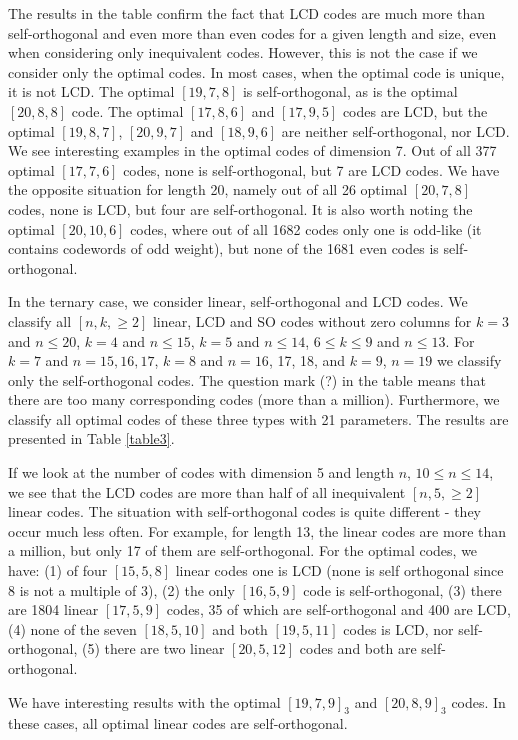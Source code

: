 \documentclass[a4paper,11pt]{article}
\begin{document}
The results in the table confirm the fact that LCD codes are much more than self-orthogonal and even more than even codes for a given length and size, even when considering only inequivalent codes. However, this is not the case if we consider only the optimal codes. In most cases, when the optimal code is unique, it is not LCD. The optimal $[19,7,8]$ is self-orthogonal, as is the optimal $[20,8,8]$ code. The optimal $[17,8,6]$ and $[17,9,5]$ codes are LCD, but the optimal $[19,8,7]$, $[20,9,7]$ and $[18,9,6]$ are neither self-orthogonal, nor LCD. We see interesting examples in the optimal codes of dimension 7. Out of all 377 optimal $[17,7,6]$ codes, none is self-orthogonal, but 7 are LCD codes. We have the opposite situation for length 20, namely out of all 26 optimal $[20,7,8]$ codes, none is LCD, but four are self-orthogonal. It is also worth noting the optimal $[20,10,6]$ codes, where out of all 1682 codes only one is odd-like (it contains codewords of odd weight), but none of the 1681 even codes is self-orthogonal.

In the ternary case, we consider linear, self-orthogonal and LCD codes. We classify all $[n,k,\ge 2]$ linear, LCD and SO codes without zero columns for $k=3$ and $n\le 20$, $k=4$ and $n\le 15$, $k=5$ and $n\le 14$, $6\le k\le 9$ and $n\le 13$. For $k=7$ and $n=15,16,17$, $k=8$ and $n=16$, 17, 18, and $k=9$, $n=19$ we classify only the self-orthogonal codes.  The question mark (?) in the table means that there are too many corresponding codes (more than a million).  Furthermore, we classify all optimal codes of these three types with 21 parameters. The results are presented in Table \ref{table3}. 

If we look at the number of codes with dimension 5 and length $n$, $10\le n\le 14$, we see that the LCD codes are more than half of all inequivalent $[n,5,\ge 2]$ linear codes. The situation with self-orthogonal codes is quite different - they occur much less often. For example, for length 13, the linear codes are more than a million, but only 17 of them are self-orthogonal. For the optimal codes, we have: (1) of four $[15,5,8]$ linear codes one is LCD (none is self orthogonal since 8 is not a multiple of 3), (2) the only $[16,5,9]$ code is self-orthogonal, (3) there are 1804 linear $[17,5,9]$ codes, 35 of which are self-orthogonal and 400 are LCD, (4) none of the seven $[18,5,10]$ and both $[19,5,11]$ codes is LCD, nor self-orthogonal, (5) there are two linear $[20,5,12]$ codes and both are self-orthogonal.

We have interesting results with the optimal $[19,7,9]_3$ and $[20,8,9]_3$ codes. In these cases, all optimal linear codes are self-orthogonal.
\end{document}
